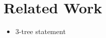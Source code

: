\section{Related Work}\label{section:related_work}
\begin{itemize}
	\item 3-tree statement
\end{itemize}